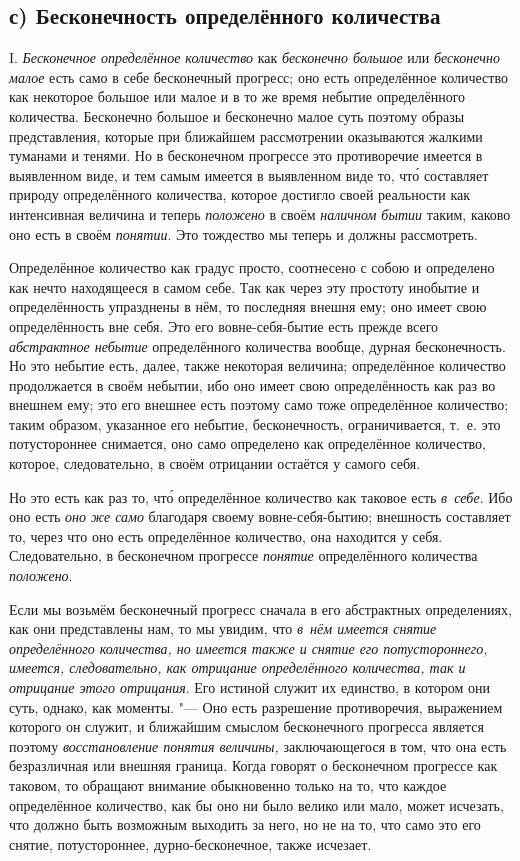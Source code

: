 \subsection[с) Бесконечность определённого количества]%
{с) Бесконечность определённого количества}

I. {\em Бесконечное определённое количество} как {\em бесконечно большое} или
{\em бесконечно малое} есть само в себе бесконечный прогресс; оно есть
определённое количество как некоторое большое или малое и в то же время
небытие определённого количества. Бесконечно большое и бесконечно малое суть
поэтому образы представления, которые при ближайшем рассмотрении оказываются
жалкими туманами и тенями. Но в бесконечном прогрессе это противоречие имеется
в выявленном виде, и тем самым имеется в выявленном виде то, чт\'{о} составляет
природу определённого количества, которое достигло своей реальности как
интенсивная величина и теперь {\em положено} в своём {\em наличном бытии}
таким, каково оно есть в своём {\em понятии}. Это тождество мы теперь и должны
рассмотреть.

Определённое количество как градус просто, соотнесено с собою и определено как
нечто находящееся в самом себе. Так как через эту простоту инобытие
и определённость упразднены в нём, то последняя внешня ему; оно имеет свою
определённость вне себя. Это его вовне-себя-бытие есть прежде всего
{\em абстрактное небытие} определённого количества вообще, дурная
бесконечность. Но это небытие есть, далее, также некоторая величина;
определённое количество продолжается в своём небытии, ибо оно имеет свою
определённость как раз во внешнем ему; это его внешнее есть поэтому само тоже
определённое количество; таким образом, указанное его небытие, бесконечность,
ограничивается, т.~е. это потустороннее снимается, оно само определено как
определённое количество, которое, следовательно, в своём отрицании остаётся
у самого себя.

Но это есть как раз то, чт\'{о} определённое количество как таковое есть
{\em в~себе}. Ибо оно есть {\em оно же само} благодаря своему вовне-себя-бытию;
внешность составляет то, через что оно есть определённое количество, она находится
у себя. Следовательно, в бесконечном прогрессе {\em понятие} определённого
количества {\em положено}.

Если мы возьмём бесконечный прогресс сначала в его абстрактных определениях,
как они представлены нам, то мы увидим, что {\em в~нём имеется снятие
определённого количества, но имеется также и снятие его потустороннего,
имеется, следовательно, как отрицание определённого количества, так и отрицание
этого отрицания}. Его истиной служит их единство, в котором они суть, однако,
как моменты. "--- Оно есть разрешение противоречия, выражением которого он
служит, и ближайшим смыслом бесконечного прогресса является поэтому
{\em восстановление понятия величины,} заключающегося в том, что она есть
безразличная или внешняя граница. Когда говорят о бесконечном прогрессе как
таковом, то обращают внимание обыкновенно только на то, что каждое определённое
количество, как бы оно ни было велико или мало, может исчезать, что должно быть
возможным выходить за него, но не на то, что само это его снятие,
потустороннее, дурно-бесконечное, также исчезает.

